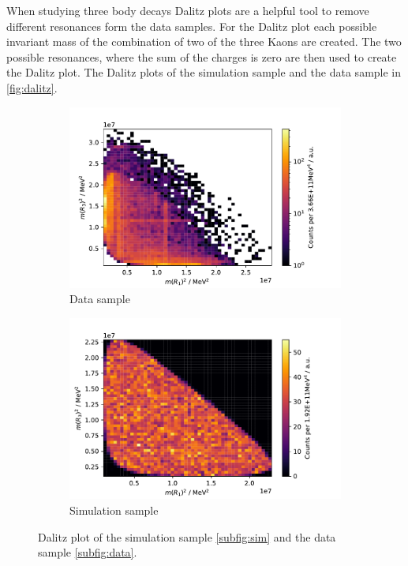 When studying three body decays Dalitz plots are a helpful tool to remove different resonances form the data samples. For the Dalitz plot each possible invariant mass of the combination of two of the three Kaons are created. The two possible resonances, where the sum of the charges is zero are then used to create the Dalitz plot. The Dalitz plots of the simulation sample and the data sample in \autoref{fig:dalitz}.


\begin{figure}[H]
	\centering
	\begin{subfigure}{0.45\textwidth}
		\includegraphics[width=\textwidth]{content/pictures/image_fin/DalitzDataHist.pdf}
		\caption{Data sample}
		\label{subfig:data}
	\end{subfigure}
	\begin{subfigure}{0.45\textwidth}
		\includegraphics[width=\textwidth]{content/pictures/image_fin/DalitzSimHist.pdf}
		\caption{Simulation sample}
		\label{subfig:sim}
	\end{subfigure} 
	\caption{Dalitz plot of the simulation sample \eqref{subfig:sim} and the data sample \eqref{subfig:data}.}
	\label{fig:dalitz}
\end{figure}


